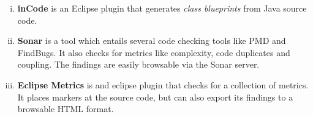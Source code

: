 \documentclass[a4paper, 10pt]{article}
\begin{document}

\begin{enumerate}[i)]
\item \textbf{inCode} is an Eclipse plugin that generates \emph{class
    blueprints} from Java source code.
\item \textbf{Sonar}
	is a tool which entails several code checking tools like PMD and FindBugs. It also checks for metrics like complexity, code duplicates and coupling.
	The findings are easily browsable via the Sonar server.
\item \textbf{Eclipse Metrics} is and eclipse plugin 
	that checks for a collection of metrics.
	It places markers at the source code, but can also
	export its findings to a browsable HTML format.
\end{enumerate}


\end{document}
